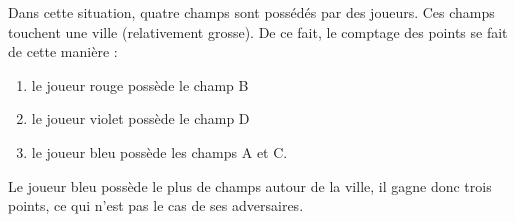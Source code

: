 Dans cette situation, quatre champs sont possédés par des joueurs. Ces champs touchent une ville (relativement grosse). De ce fait, le comptage des points se fait de cette manière :
\begin{enumerate}
    \item le joueur rouge possède le champ B
    \item le joueur violet possède le champ D
    \item le joueur bleu possède les champs A et C.
\end{enumerate}

\vspace{0.5cm}

Le joueur bleu possède le plus de champs autour de la ville, il gagne donc trois points, ce qui n'est pas le cas de ses adversaires.

